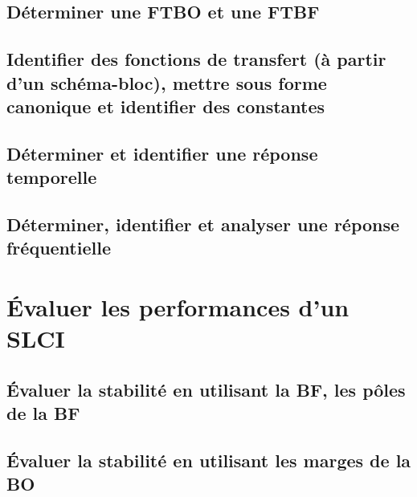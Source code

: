 \clearpage 
\newpage 
\section{Déterminer une FTBO et une FTBF} 
\clearpage 
\newpage 
\section{Identifier des fonctions de transfert (à partir d'un schéma-bloc), mettre sous forme canonique et identifier des constantes} 
\clearpage 
\newpage 
\section{Déterminer et identifier une réponse temporelle} 
\clearpage 
\newpage 
\section{Déterminer, identifier et analyser une réponse fréquentielle} 
\graphicspath{{\repStyle/png/}{../SLCI/SLCI-11-DiagrammeBode/510_01_Divers/images/}} 
 
 
\graphicspath{{\repStyle/png/}{../SLCI/SLCI-11-DiagrammeBode/510_02_Divers/images/}} 
 
 
\graphicspath{{\repStyle/png/}{../SLCI/SLCI-11-DiagrammeBode/510_03_Divers/images/}} 
 
 
\graphicspath{{\repStyle/png/}{../SLCI/SLCI-11-DiagrammeBode/511_Divers/images/}} 
 
 
\clearpage 
\newpage 
\setchapterpreamble[u]{\margintoc} 
\chapter{Évaluer les performances d'un SLCI} 
\section{Évaluer la stabilité en utilisant la BF, les pôles de la BF} 
\clearpage 
\newpage 
\section{Évaluer la stabilité en utilisant les marges de la BO} 
\graphicspath{{\repStyle/png/}{../PERF/PERF-02-Marges/61_Hemostase/images/}} 
 
 

